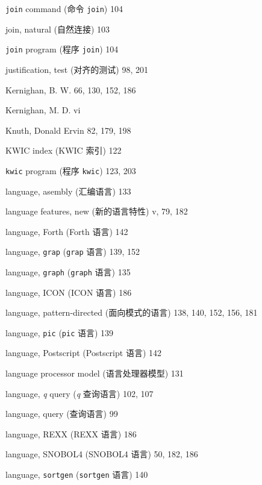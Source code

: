 \begin{multicols}{3}
\hangindent=3pc  \verb'join' command (命令 \verb'join') 104

\hangindent=3pc  join, natural (自然连接) 103

\hangindent=3pc  \verb'join' program (程序 \verb'join') 104

\hangindent=3pc  justification, test (对齐的测试) 98, 201

\hangindent=3pc  Kernighan, B. W. 66, 130, 152, 186

\hangindent=3pc  Kernighan, M. D. vi 

\hangindent=3pc  Knuth, Donald Ervin 82, 179, 198

\hangindent=3pc  KWIC index (KWIC 索引) 122

\hangindent=3pc  \verb'kwic' program (程序 \verb'kwic') 123, 203

\hangindent=3pc  language, asembly (汇编语言) 133

\hangindent=3pc  language features, new (新的语言特性) v, 79, 182

\hangindent=3pc  language, Forth (Forth 语言) 142

\hangindent=3pc  language, \verb'grap' (\verb'grap' 语言) 139, 152

\hangindent=3pc  language, \verb'graph' (\verb'graph' 语言) 135

\hangindent=3pc  language, ICON (ICON 语言) 186

\hangindent=3pc  language, pattern-directed (面向模式的语言) 138, 140, 152, 156, 181

\hangindent=3pc  language, \verb'pic' (\verb'pic' 语言) 139

\hangindent=3pc  language, Postscript (Postscript 语言) 142

\hangindent=3pc  language processor model (语言处理器模型) 131

\hangindent=3pc  language, \textit{q} query (\textit{q}
查询语言) 102, 107

\hangindent=3pc  language, query (查询语言) 99

\hangindent=3pc  language, REXX (REXX 语言) 186

\hangindent=3pc  language, SNOBOL4 (SNOBOL4 语言) 50, 182, 186

\hangindent=3pc  language, \verb'sortgen' (\verb'sortgen' 语言) 140


\end{multicols}
